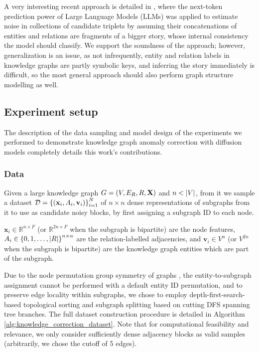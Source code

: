 A very interesting recent approach is detailed in \cite{dong_refining_2025}, where the next-token prediction power of Large Language Models (LLMs) was applied to estimate noise in collections of candidate triplets by assuming their concatenations of entities and relations are fragments of a bigger story, whose internal consistency the model should classify. We support the soundness of the approach; however, generalization is an issue, as not infrequently, entity and relation labels in knowledge graphs are partly symbolic keys, and inferring the story immediately is difficult, so the most general approach should also perform graph structure modelling as well.

\subsection{Experiment setup}

The description of the data sampling and model design of the experiments we performed to demonstrate knowledge graph anomaly correction with diffusion models completely details this work's contributions.

\subsubsection{Data}

Given a large knowledge graph $G=\mathopen{}\left(V, E_R, R, \mathbf{X}\right)$ and $n<\mathopen{}\left|V\right|$, from it we sample a dataset $\mathcal{D}=\mathopen{}\left\{\mathopen{}\left(\mathbf{x}_i,A_i,\mathbf{v}_i\right)\right\}_{i=1}^{N}$ of $n \times n$ dense representations of subgraphs from it to use as candidate noisy blocks, by first assigning a subgraph ID to each node. 

$\mathbf{x}_i \in \mathbb{R}^{n \times F}$ (or $\mathbb{R}^{2n \times F}$ when the subgraph is bipartite) are the node features, $A_i \in \mathopen{}\left\{0,1,\dots,|R|\right\}^{n \times n}$ are the relation-labelled adjacencies, and $\mathbf{v}_i \in V^{n}$ (or $V^{2n}$ when the subgraph is bipartite) are the knowledge graph entities which are part of the subgraph.

Due to the node permutation group symmetry of graphs \cite{bronstein_geometric_2021}, the entity-to-subgraph assignment cannot be performed with a default entity ID permutation, and to preserve edge locality within subgraphs, we chose to employ depth-first-search-based topological sorting and subgraph splitting based on cutting DFS spanning tree branches. The full dataset construction procedure is detailed in Algorithm \ref{alg:knowledge_correction_dataset}. Note that for computational feasibility and relevance, we only consider sufficiently dense adjacency blocks as valid samples (arbitrarily, we chose the cutoff of 5 edges). 

